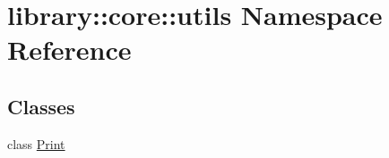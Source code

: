 \hypertarget{namespacelibrary_1_1core_1_1utils}{}\section{library\+:\+:core\+:\+:utils Namespace Reference}
\label{namespacelibrary_1_1core_1_1utils}
\subsection*{Classes}
\begin{DoxyCompactItemize}
\item 
class \hyperlink{classlibrary_1_1core_1_1utils_1_1_print}{Print}
\end{DoxyCompactItemize}
